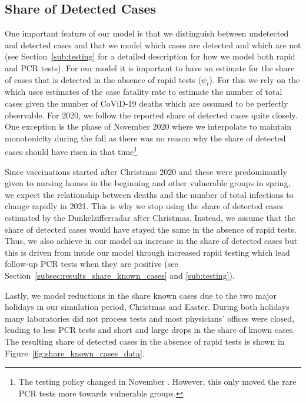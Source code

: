 \subsection{Share of Detected Cases}
\label{subsec:data_share_known_cases}


One important feature of our model is that we distinguish between undetected and detected
cases and that we model which cases are detected and which are not (see
Section~\ref{sub:testing} for a detailed description for how we model both rapid and PCR
tests). For our model it is important to have an estimate for the share of cases that is
detected in the absence of rapid tests ($\psi_t$). For this we rely on the
\cite[Dunkelzifferradar Project][]{Dunkelzifferradar2020} which uses estimates of the
case fatality rate to estimate the number of total cases given the number of CoViD-19
deaths which are assumed to be perfectly observable. For 2020, we follow the reported
share of detected cases quite closely. One exception is the phase of November 2020 where
we interpolate to maintain monotonicity during the fall as there was no reason why the
share of detected cases should have risen in that time\footnote{The testing policy
changed in November \citep{RKI2020a}. However, this only moved the rare PCR tests more
towards vulnerable groups.}

Since vaccinations started after Christmas 2020 and these were predominantly given to
nursing homes in the beginning and other vulnerable groups in spring, we expect the
relationship between deaths and the number of total infections to change rapidly in 2021.
This is why we stop using the share of detected cases estimated by the Dunkelzifferradar
after Christmas. Instead, we assume that the share of detected cases would have stayed
the same in the absence of rapid tests. Thus, we also achieve in our model an increase in
the share of detected cases but this is driven from inside our model through increased
rapid testing which lead follow-up PCR tests when they are positive (see
Section~\ref{subsec:results_share_known_cases} and \ref{sub:testing}).

Lastly, we model reductions in the share known cases due to the two major holidays in our
simulation period, Christmas and Easter. During both holidays many laboratories did not
process tests and most physicians' offices were closed, leading to less PCR tests and
short and large drops in the share of known cases. The resulting share of detected cases
in the absence of rapid tests is shown in Figure~\ref{fig:share_known_cases_data}.

